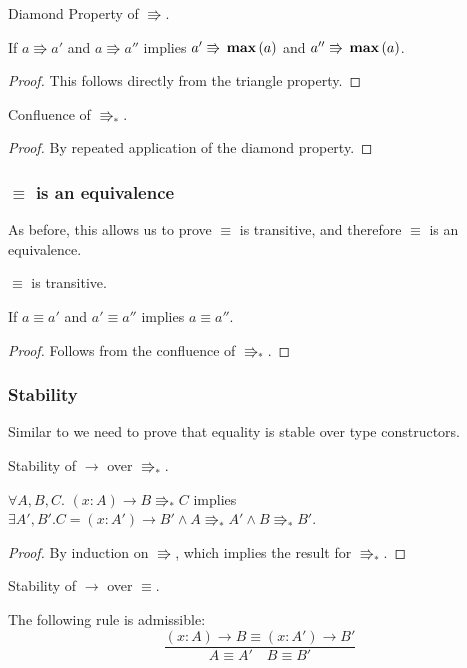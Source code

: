 \begin{lem} Diamond Property of $\Rrightarrow$.
 
If $a\Rrightarrow a'$ and $a\Rrightarrow a''$ implies $a'\Rrightarrow\, \textbf{max}{} \left(a\right)$ and $a''\Rrightarrow\, \textbf{max}{} \left(a\right)$.
\end{lem}
\begin{proof}
  This follows directly from the triangle property.
\end{proof}
 
\begin{lem} Confluence of $\Rrightarrow_{\ast}$.
\end{lem}
\begin{proof}
By repeated application of the diamond property.
\end{proof}
   
\subsubsection{$\equiv$ is an equivalence}
As before, this allows us to prove $\equiv$ is transitive, and therefore $\equiv$ is an equivalence.

\begin{thm} $\equiv$ is transitive.
 
If $a\equiv a'$ and $a'\equiv a''$ implies $a\equiv a''$.
\end{thm}
\begin{proof}
Follows from the confluence of $\Rrightarrow_{\ast}$.
\end{proof}
 
\subsubsection{Stability}
Similar to  we need to prove that equality is stable over type constructors.
\begin{lem} Stability of $\rightarrow$ over $\Rrightarrow_{\ast}$.
 
$\forall A,B,C.$ $\left(x:A\right)\rightarrow B\Rrightarrow_{\ast}C$ implies $\exists A',B'.C=\left(x:A'\right)\rightarrow B'\land A\Rrightarrow_{\ast}A'\land B\Rrightarrow_{\ast}B'$.
\end{lem}
\begin{proof}
By induction on $\Rrightarrow$, which implies the result for $\Rrightarrow_{\ast}$.
\end{proof}

\begin{cor} Stability of $\rightarrow$ over $\equiv$.
 
The following rule is admissible:
\[
\frac{\left(x:A\right)\rightarrow B\equiv\left(x:A'\right)\rightarrow B'}{A\equiv A'\quad B\equiv B'}
\]
\end{cor}
 
